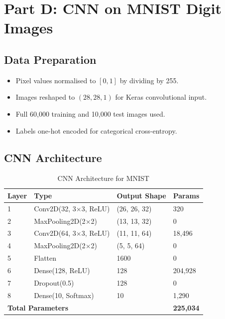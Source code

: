 \documentclass[12pt,a4paper]{article}
\begin{document}
\section{Part D: CNN on MNIST Digit Images}

\subsection{Data Preparation}

\begin{itemize}
    \item Pixel values normalised to $[0, 1]$ by dividing by 255.
    \item Images reshaped to $(28, 28, 1)$ for Keras convolutional input.
    \item Full 60,000 training and 10,000 test images used.
    \item Labels one-hot encoded for categorical cross-entropy.
\end{itemize}

\subsection{CNN Architecture}

\begin{table}[H]
\centering
\caption{CNN Architecture for MNIST}
\begin{tabular}{llll}
\toprule
\textbf{Layer} & \textbf{Type} & \textbf{Output Shape} & \textbf{Params} \\
\midrule
1 & Conv2D(32, 3$\times$3, ReLU)  & (26, 26, 32) & 320 \\
2 & MaxPooling2D(2$\times$2)       & (13, 13, 32) & 0 \\
3 & Conv2D(64, 3$\times$3, ReLU)  & (11, 11, 64) & 18,496 \\
4 & MaxPooling2D(2$\times$2)       & (5, 5, 64)   & 0 \\
5 & Flatten                        & 1600         & 0 \\
6 & Dense(128, ReLU)               & 128          & 204,928 \\
7 & Dropout(0.5)                   & 128          & 0 \\
8 & Dense(10, Softmax)             & 10           & 1,290 \\
\midrule
\multicolumn{3}{l}{\textbf{Total Parameters}} & \textbf{225,034} \\
\bottomrule
\end{tabular}
\end{table}
\end{document}
